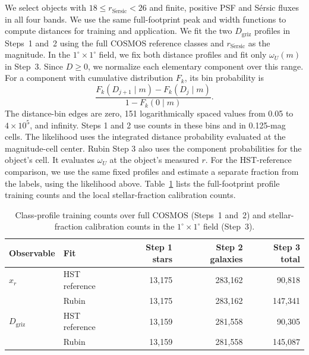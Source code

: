 We select objects with \(18\leq r_{\mathrm{S\acute{e}rsic}}<26\) and
finite, positive PSF and S\'{e}rsic fluxes in all four bands. We use
the same full-footprint peak and width functions to compute distances
for training and application. We fit the two \(D_{\mathrm{griz}}\)
profiles in Steps~1 and~2 using the full COSMOS reference classes and
\(r_{\mathrm{S\acute{e}rsic}}\) as the magnitude. In the
\(1^\circ\times1^\circ\) field, we fix both distance profiles and
fit only \(\omega_U(m)\) in Step~3. Since \(D\geq0\),
we normalize each elementary component over this range. For a
component with cumulative distribution \(F_k\), its bin probability is
\begin{equation}
 \frac{F_k(D_{j+1}\mid m)-F_k(D_j\mid m)}{1-F_k(0\mid m)}.
 \label{eq:v12-appendix-distance-bin}
\end{equation}
The distance-bin edges are zero, 151 logarithmically spaced values
from 0.05 to \(4\times 10^5\), and infinity. Steps 1 and 2 use counts
in these bins and in 0.125-mag cells. The likelihood uses the
integrated distance probability evaluated at the magnitude-cell
center. Rubin Step 3 also uses the component probabilities for the
object's cell. It evaluates \(\omega_U\) at the object's measured
\(r\). For the HST-reference comparison, we use the same fixed profiles
and estimate a separate fraction from the labels, using the likelihood
above. Table~\ref{tab:v12-calibration-counts} lists the full-footprint
profile training counts and the local stellar-fraction calibration
counts.

\begin{table}[htbp]
\centering
\caption{Class-profile training counts over full COSMOS (Steps~1 and~2)
and stellar-fraction calibration counts in the \(1^\circ\times1^\circ\)
field (Step~3).}
\label{tab:v12-calibration-counts}
\begin{tabular}{llrrr}
\hline
Observable & Fit & Step 1 stars & Step 2 galaxies & Step 3 total\\
\hline
\(x_r\) & HST reference & 13,175 & 283,162 & 90,818\\
        & Rubin         & 13,175 & 283,162 & 147,341\\
\(D_{\mathrm{griz}}\) & HST reference & 13,159 & 281,558 & 90,305\\
        & Rubin         & 13,159 & 281,558 & 145,087\\
\hline
\end{tabular}
\end{table}
